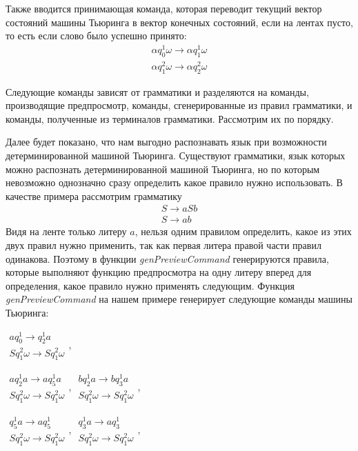 \documentclass[14pt]{matmex-diploma-custom}
\begin{document}
Также вводится принимающая команда, которая переводит текущий вектор состояний машины Тьюринга в вектор конечных состояний, если на лентах пусто, то есть если слово было успешно принято:
$$\begin{array}{lcl}
    \alpha q_0^1 \omega \to \alpha q_1^1 \omega \\
    \alpha q_1^2 \omega \to \alpha q_2^2 \omega 
\end{array}$$

Следующие команды зависят от грамматики и разделяются на команды, производящие предпросмотр, команды, сгенерированные из правил грамматики, 
и команды, полученные из терминалов грамматики. Рассмотрим их по порядку.

Далее будет показано, что нам выгодно распознавать язык при возможности детерминированной машиной Тьюринга. Существуют грамматики, язык которых 
можно распознать детерминированной машиной Тьюринга, но по которым невозможно однозначно сразу определить какое правило нужно использовать. В качестве примера рассмотрим грамматику 
$$\begin{array}{lcl}
    S \to a S b \\
    S \to a b
\end{array}$$ 
Видя на ленте только литеру $a$, нельзя одним правилом определить, какое из этих двух правил нужно применить, так как первая литера  правой части правил одинакова. Поэтому в функции \textit{genPreviewCommand} генерируются правила, которые выполняют функцию предпросмотра на одну литеру вперед для определения, какое правило нужно применять следующим. Функция \textit{genPreviewCommand} на нашем примере генерирует следующие команды машины Тьюринга: 

$\begin{array}{lcl}
    a q_0^1 \to q_2^1 a \\
    S q_1^2 \omega \to S q_1^2 \omega 
\end{array}$,

$\begin{array}{lcl}
    a q_2^1 a \to a q_5^1 a \\
    S q_1^2 \omega \to S q_1^2 \omega 
\end{array}$,
$\begin{array}{lcl}
    b q_2^1 a \to b q_3^1 a \\
    S q_1^2 \omega \to S q_1^2 \omega 
\end{array}$,

$\begin{array}{lcl}
    q_5^1 a \to a q_5^1 \\
    S q_1^2 \omega \to S q_1^2 \omega 
\end{array}$,
$\begin{array}{lcl}
    q_3^1 a \to a q_3^1 \\
    S q_1^2 \omega \to S q_1^2 \omega 
\end{array}$,
\end{document}
